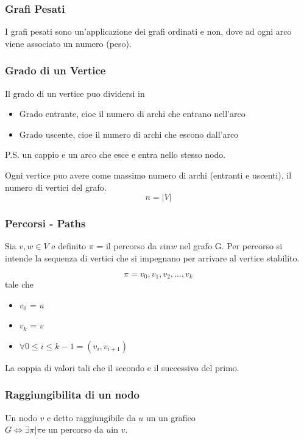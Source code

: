 \subsubsection{Grafi Pesati}
I grafi pesati sono un'applicazione dei grafi ordinati e non, dove ad ogni arco viene associato un numero (peso).

\subsubsection{Grado di un Vertice}

Il grado di un vertice puo dividersi in 
\begin{itemize}
	\item Grado entrante, cioe il numero di archi che entrano nell'arco
	\item Grado uscente, cioe il numero di archi che escono dall'arco
\end{itemize}

P.S. un cappio e un arco che esce e entra nello stesso nodo.

Ogni vertice puo avere come massimo numero di archi (entranti e uscenti), il numero di vertici del grafo.
$$n = |V|$$

\subsubsection{Percorsi - Paths}
Sia $v,w \in V$ e definito $\pi$ = il percorso da $v \text{in} w$ nel grafo G. Per percorso si intende la sequenza di vertici che si impegnano per arrivare al vertice stabilito. 

$$\pi = v_0,v_1,v_2,\dots,v_k$$ tale che 

\begin{itemize}
	\item $v_0$ = $u$
	\item $v_k$ = $v$
	\item $\forall  0\le i \le k-1 = (v_i,v_{i+1})$
\end{itemize}

La coppia di valori tali che il secondo e il successivo del primo.

\subsubsection{Raggiungibilita di un nodo}

Un nodo $v $ e detto raggiungibile da $u$ un un grafico $G \iff \exists \pi | \pi \text{e un percorso da }u \text{in } v$.

